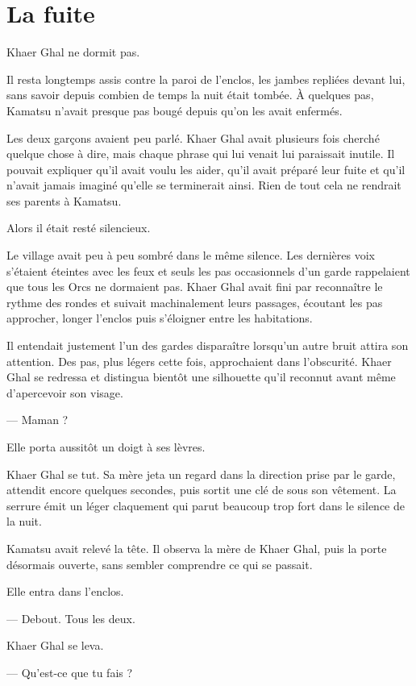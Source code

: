 \chapter{La fuite}
\label{chap:la-fuite}

Khaer Ghal ne dormit pas.

Il resta longtemps assis contre la paroi de l'enclos, les jambes repliées
devant lui, sans savoir depuis combien de temps la nuit était tombée. À
quelques pas, Kamatsu n'avait presque pas bougé depuis qu'on les avait
enfermés.

Les deux garçons avaient peu parlé. Khaer Ghal avait plusieurs fois cherché
quelque chose à dire, mais chaque phrase qui lui venait lui paraissait inutile.
Il pouvait expliquer qu'il avait voulu les aider, qu'il avait préparé leur
fuite et qu'il n'avait jamais imaginé qu'elle se terminerait ainsi. Rien de
tout cela ne rendrait ses parents à Kamatsu.

Alors il était resté silencieux.

Le village avait peu à peu sombré dans le même silence. Les dernières voix
s'étaient éteintes avec les feux et seuls les pas occasionnels d'un garde
rappelaient que tous les Orcs ne dormaient pas. Khaer Ghal avait fini par
reconnaître le rythme des rondes et suivait machinalement leurs passages,
écoutant les pas approcher, longer l'enclos puis s'éloigner entre les
habitations.

Il entendait justement l'un des gardes disparaître lorsqu'un autre bruit attira
son attention. Des pas, plus légers cette fois, approchaient dans l'obscurité.
Khaer Ghal se redressa et distingua bientôt une silhouette qu'il reconnut avant
même d'apercevoir son visage.

— Maman ?

Elle porta aussitôt un doigt à ses lèvres.

Khaer Ghal se tut. Sa mère jeta un regard dans la direction prise par le garde,
attendit encore quelques secondes, puis sortit une clé de sous son vêtement. La
serrure émit un léger claquement qui parut beaucoup trop fort dans le silence
de la nuit.

Kamatsu avait relevé la tête. Il observa la mère de Khaer Ghal, puis la porte
désormais ouverte, sans sembler comprendre ce qui se passait.

Elle entra dans l'enclos.

— Debout. Tous les deux.

Khaer Ghal se leva.

— Qu'est-ce que tu fais ?

